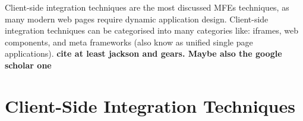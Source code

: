 Client-side integration techniques are the most discussed \acp{MFE} techniques, as many modern web pages require dynamic application design. Client-side integration techniques can be categorised into many categories like: iframes, web components, and meta frameworks (also know as unified single page applications). \textbf{cite at least jackson and gears. Maybe also the google scholar one}

\section{Client-Side Integration Techniques}


